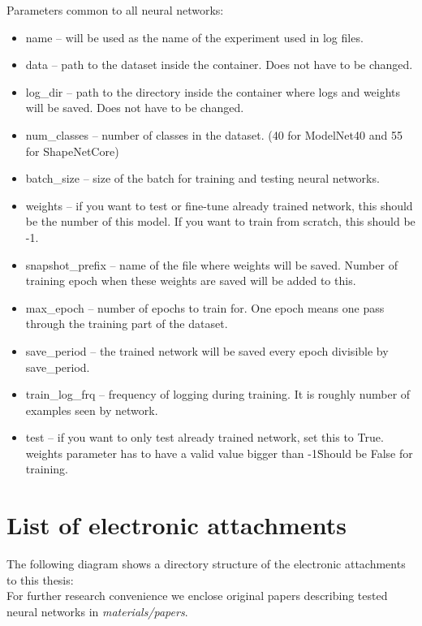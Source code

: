 Parameters common to all neural networks:
\begin{itemize}
	\item{name -- will be used as the name of the experiment used in log files.}
	\item{data -- path to the dataset inside the container. Does not have to be changed.}
	\item{log\_dir -- path to the directory inside the container where logs and weights will be saved. Does not have to be changed.}
	\item{num\_classes -- number of classes in the dataset. (40 for ModelNet40 and 55 for ShapeNetCore)}
	\item{batch\_size -- size of the batch for training and testing neural networks.}
	\item{weights -- if you want to test or fine-tune already trained network, this should be the number of this model. If you want to train from scratch, this should be -1.}
	\item{snapshot\_prefix -- name of the file where weights will be saved. Number of training epoch when these weights are saved will be added to this.}
	\item{max\_epoch -- number of epochs to train for. One epoch means one pass through the training part of the dataset.}
	\item{save\_period -- the trained network will be saved every epoch divisible by save\_period.}
	\item{train\_log\_frq -- frequency of logging during training. It is roughly number of examples seen by network.}
	\item{test -- if you want to only test already trained network, set this to True. weights parameter has to have a valid value bigger than -1\. Should be False for training.}
\end{itemize}

\chapter{List of electronic attachments}
\label{Attachment:electronic}
The following diagram shows a directory structure of the electronic attachments to this thesis: \\
\vspace{1cm}
For further research convenience we enclose original papers describing tested neural networks in \textit{materials/papers}.


